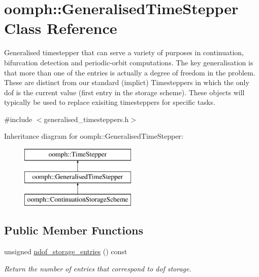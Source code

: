\hypertarget{classoomph_1_1GeneralisedTimeStepper}{}\section{oomph\+:\+:Generalised\+Time\+Stepper Class Reference}
\label{classoomph_1_1GeneralisedTimeStepper}


Generalised timestepper that can serve a variety of purposes in continuation, bifurcation detection and periodic-\/orbit computations. The key generalisation is that more than one of the entries is actually a degree of freedom in the problem. These are distinct from our standard (implict) Timesteppers in which the only dof is the current value (first entry in the storage scheme). These objects will typically be used to replace exisiting timesteppers for specific tasks.  




{\ttfamily \#include $<$generalised\+\_\+timesteppers.\+h$>$}

Inheritance diagram for oomph\+:\+:Generalised\+Time\+Stepper\+:\begin{figure}[H]
\begin{center}
\leavevmode
\includegraphics[height=3.000000cm]{classoomph_1_1GeneralisedTimeStepper}
\end{center}
\end{figure}
\subsection*{Public Member Functions}
\begin{DoxyCompactItemize}
\item 
unsigned \hyperlink{classoomph_1_1GeneralisedTimeStepper_a0ffd908ef40b0dcd0ef5a4adbfbe4d3e}{ndof\+\_\+storage\+\_\+entries} () const
\begin{DoxyCompactList}\small\item\em Return the number of entries that correspond to dof storage. \end{DoxyCompactList}\end{DoxyCompactItemize}
